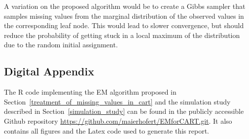 \documentclass[12pt, twoside]{article}
\newcommand{\1}{\mathbb{1}}
\begin{document}
A variation on the proposed algorithm would be to create a Gibbs sampler that samples missing values from the marginal distribution  of the observed values in the corresponding leaf node. This would lead to slower convergence, but should reduce the probability of getting stuck in a local maximum of the distribution due to the random initial assignment.







\clearpage
 
{}


\clearpage
\begin{appendix}
\appendix
\section*{Digital Appendix}
The R code implementing the EM algorithm proposed in Section~\ref{treatment_of_missing_values_in_cart} and the simulation study described in Section~\ref{simulation_study} can be found in the publicly accessible Github repository \url{https://github.com/maierhofert/EMforCART.git}. 
It also contains all figures and the Latex code used to generate this report.

\end{appendix}
\end{document}
